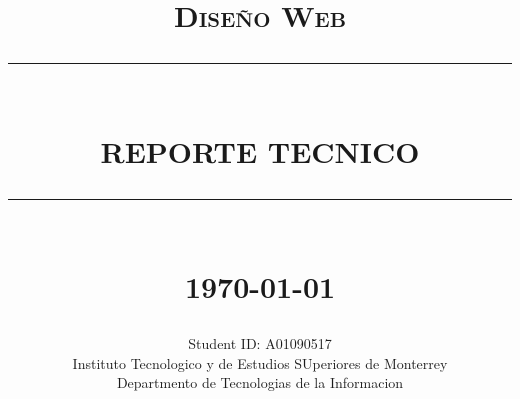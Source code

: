 \documentclass[12pt]{report}
\newcommand{\HRule}[1]{\rule{\linewidth}{#1}}
\begin{document}
\title{ \normalsize \textsc{Diseño Web}
		\\ [2.0cm]
		\HRule{0.5pt} \\
		\LARGE \textbf{\uppercase{Reporte Tecnico}}
		\HRule{2pt} \\ [0.5cm]
		\normalsize \today \vspace*{5\baselineskip}}

\date{}

\author{
		Student ID: A01090517 \\ 
		Instituto Tecnologico y de Estudios SUperiores de Monterrey \\
		Departmento de Tecnologias de la Informacion }

\maketitle
\newpage

\sectionfont{\scshape}

\end{document}
